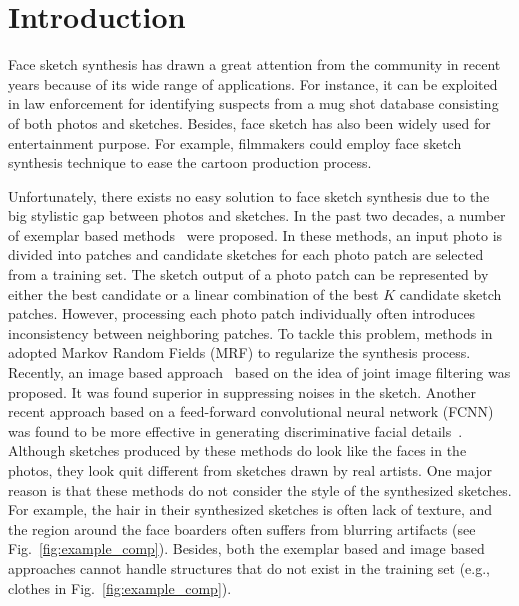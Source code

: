 \documentclass[10pt,twocolumn,letterpaper]{article}
\begin{document}
{
\section{Introduction}
}
Face sketch synthesis has drawn a great attention from the community in recent years because of its wide range of applications. For instance, it can be exploited in law enforcement for identifying suspects from a mug shot database consisting of both photos and sketches. Besides, face sketch has also been widely used for entertainment purpose. For example, filmmakers could employ face sketch synthesis technique to ease the cartoon production process. \par
Unfortunately, there exists no easy solution to face sketch synthesis due to the big stylistic gap between photos and sketches. In the past two decades, a number of exemplar based methods~\cite{wang2009face,zhang2010lighting,zhou2012markov} were proposed. In these methods, an input photo is divided into patches and candidate sketches for each photo patch are selected from a training set. The sketch output of a photo patch can be represented by either the best candidate or a linear combination of the best $K$ candidate sketch patches. However, processing each photo patch individually often introduces inconsistency between neighboring patches. To tackle this problem, methods in~\cite{wang2009face,zhang2010lighting,zhou2012markov} adopted Markov Random Fields (MRF) to regularize the synthesis process. Recently, an image based approach~\cite{song2014real} based on the idea of joint image filtering was proposed. It was found superior in suppressing noises in the sketch. Another recent approach based on a feed-forward convolutional neural network (FCNN) was found to be more effective in generating discriminative facial details~\cite{zhang2015end}. Although sketches produced by these methods do look like the faces in the photos, they look quit different from sketches drawn by real artists. One major reason is that these methods do not consider the style of the synthesized sketches. For example, the hair in their synthesized sketches is often lack of texture, and the region around the face boarders often suffers from blurring artifacts (see Fig.~\ref{fig:example_comp}). Besides, both the exemplar based and image based approaches cannot handle structures that do not exist in the training set (e.g., clothes in Fig.~\ref{fig:example_comp}).\par
\end{document}
